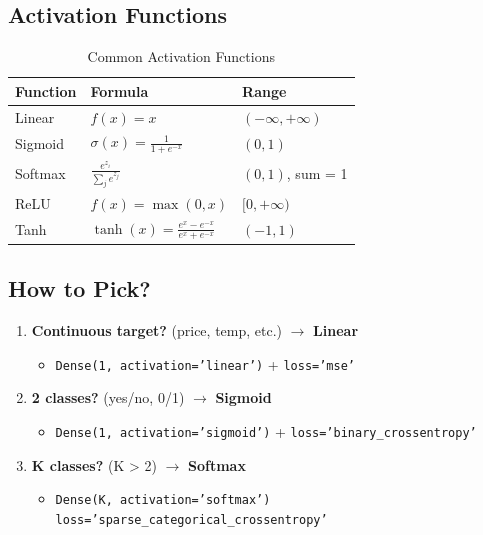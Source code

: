 \documentclass[12pt,a4paper]{article}
\begin{document}
\subsection{Activation Functions}

\begin{table}[h!]
\centering
\renewcommand{\arraystretch}{1.5}
\begin{tabular}{|l|l|l|}
\hline
\textbf{Function} & \textbf{Formula} & \textbf{Range} \\
\hline
Linear & $f(x) = x$ & $(-\infty, +\infty)$ \\
\hline
Sigmoid & $\sigma(x) = \frac{1}{1 + e^{-x}}$ & $(0, 1)$ \\
\hline
Softmax & $\frac{e^{z_i}}{\sum_j e^{z_j}}$ & $(0, 1)$, sum = 1 \\
\hline
ReLU & $f(x) = \max(0, x)$ & $[0, +\infty)$ \\
\hline
Tanh & $\tanh(x) = \frac{e^x - e^{-x}}{e^x + e^{-x}}$ & $(-1, 1)$ \\
\hline
\end{tabular}
\caption{Common Activation Functions}
\end{table}

\subsection{How to Pick?}

\begin{enumerate}
    \item \textbf{Continuous target?} (price, temp, etc.) $\rightarrow$ \textbf{Linear}
    \begin{itemize}
        \item \texttt{Dense(1, activation='linear')} + \texttt{loss='mse'}
    \end{itemize}

    \item \textbf{2 classes?} (yes/no, 0/1) $\rightarrow$ \textbf{Sigmoid}
    \begin{itemize}
        \item \texttt{Dense(1, activation='sigmoid')} + \texttt{loss='binary\_crossentropy'}
    \end{itemize}

    \item \textbf{K classes?} (K > 2) $\rightarrow$ \textbf{Softmax}
    \begin{itemize}
        \item \texttt{Dense(K, activation='softmax')}\\
              \texttt{loss='sparse\_categorical\_crossentropy'}
    \end{itemize}
\end{enumerate}

\vfill

\noindent{}
\end{document}
